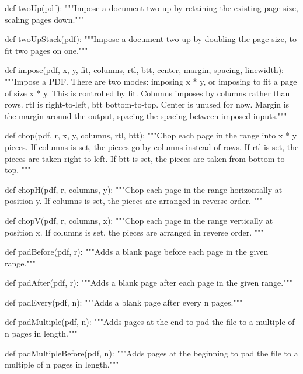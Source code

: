 def twoUp(pdf):
    """Impose a document two up by retaining the existing page size, scaling
    pages down."""

def twoUpStack(pdf):
    """Impose a document two up by doubling the page size, to fit two pages on
    one."""

def impose(pdf, x, y, fit, columns, rtl, btt, center, margin, spacing, linewidth):
    """Impose a PDF. There are two modes: imposing x * y, or imposing to fit a
    page of size x * y. This is controlled by fit. Columns imposes by columns
    rather than rows. rtl is right-to-left, btt bottom-to-top. Center is unused
    for now. Margin is the margin around the output, spacing the spacing
    between imposed inputs."""

def chop(pdf, r, x, y, columns, rtl, btt):
    """Chop each page in the range into x * y pieces. If columns is set, the
    pieces go by columns instead of rows. If rtl is set, the pieces are taken
    right-to-left. If btt is set, the pieces are taken from bottom to top. """

def chopH(pdf, r, columns, y):
    """Chop each page in the range horizontally at position y. If columns is
    set, the pieces are arranged in reverse order. """

def chopV(pdf, r, columns, x):
    """Chop each page in the range vertically at position x. If columns is
    set, the pieces are arranged in reverse order. """

def padBefore(pdf, r):
    """Adds a blank page before each page in the given range."""

def padAfter(pdf, r):
    """Adds a blank page after each page in the given range."""

def padEvery(pdf, n):
    """Adds a blank page after every n pages."""

def padMultiple(pdf, n):
    """Adds pages at the end to pad the file to a multiple of n pages in
    length."""

def padMultipleBefore(pdf, n):
    """Adds pages at the beginning to pad the file to a multiple of n pages in
    length."""
